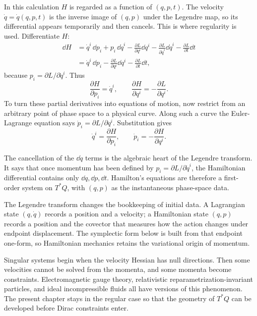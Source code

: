 \begin{derivation}
In this calculation \(H\) is regarded as a function of \((q,p,t)\). The
velocity \(\dot q=\dot q(q,p,t)\) is the inverse image of \((q,p)\) under the
Legendre map, so its differential appears temporarily and then cancels. This is
where regularity is used.
Differentiate \(H\):
\[
\begin{aligned}
  \dd H
  &=
  \dot q^i\,\dd p_i
  +
  p_i\,\dd \dot q^i
  -
  \frac{\partial L}{\partial q^i}\dd q^i
  -
  \frac{\partial L}{\partial \dot q^i}\dd \dot q^i
  -
  \frac{\partial L}{\partial t}\dd t\\
  &=
  \dot q^i\,\dd p_i
  -
  \frac{\partial L}{\partial q^i}\dd q^i
  -
  \frac{\partial L}{\partial t}\dd t,
\end{aligned}
\]
because \(p_i=\partial L/\partial \dot q^i\). Thus
\[
  \frac{\partial H}{\partial p_i}=\dot q^i,
  \qquad
  \frac{\partial H}{\partial q^i}=-\frac{\partial L}{\partial q^i}.
\]
To turn these partial derivatives into equations of motion, now restrict from
an arbitrary point of phase space to a physical curve. Along such a curve the
Euler-Lagrange equation says
\(\dot p_i=\partial L/\partial q^i\). Substitution gives
\[
  \boxed{
    \dot q^i=\frac{\partial H}{\partial p_i},
    \qquad
    \dot p_i=-\frac{\partial H}{\partial q^i}
  }.
\]
\end{derivation}

The cancellation of the \(\dd\dot q\) terms is the algebraic heart of the
Legendre transform. It says that once momentum has been defined by
\(p_i=\partial L/\partial\dot q^i\), the Hamiltonian differential contains
only \(\dd q,\dd p,\dd t\). Hamilton's equations are therefore a first-order
system on \(T^*Q\), with \((q,p)\) as the instantaneous phase-space data.

The Legendre transform changes the bookkeeping of initial data. A Lagrangian
state \((q,\dot q)\) records a position and a velocity; a Hamiltonian state
\((q,p)\) records a position and the covector that measures how the action
changes under endpoint displacement. The symplectic form below is built from
that endpoint one-form, so Hamiltonian mechanics retains the variational origin
of momentum.

Singular systems begin when the velocity Hessian has null directions. Then some
velocities cannot be solved from the momenta, and some momenta become
constraints. Electromagnetic gauge theory, relativistic
reparametrization-invariant particles, and ideal incompressible fluids all have
versions of this phenomenon. The present chapter stays in the regular case so
that the geometry of \(T^*Q\) can be developed before Dirac constraints enter.

